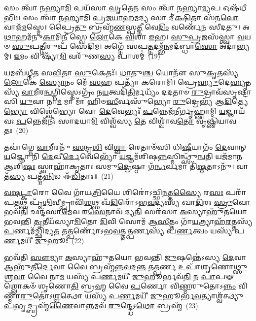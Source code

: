 {\anuvakamend[{\-\ul{𑌸}\-\-\ul{𑌮𑌾}\-𑌨𑌾\-\ul{𑌨𑌾}\-𑌮𑍋𑌷᳴𑌧𑍀\-\ul{𑌷𑍍𑌵𑍇}\-𑌵 \ul{𑌪}\-𑌶𑍂𑌨𑍍𑌮\-\ul{𑌹𑍍𑌯𑌂} 𑌯𑌜᳴𑌮𑌾\-\ul{𑌨𑌾}\-𑌯𑍈𑌕᳴𑌞𑍍𑌚}]}%

𑌸𑌂 𑌤𑍍𑌵𑌾᳴ 𑌨𑌹𑍍𑌯𑌾\-\ul{𑌮𑌿} 𑌪𑌯᳴𑌸𑌾 \ul{𑌘𑍃}\-𑌤𑍇\-\ul{𑌨} 𑌸𑌂 𑌤𑍍𑌵𑌾᳴ 𑌨𑌹𑍍𑌯𑌾\-\ul{𑌮𑍍𑌯}\-𑌪 𑌓𑌷᳴𑌧𑍀𑌭𑌿𑌃। 𑌸𑌂 𑌤𑍍𑌵𑌾᳴ 𑌨𑌹𑍍𑌯𑌾𑌮𑌿 \ul{𑌪𑍍𑌰}\-𑌜\-\ul{𑌯𑌾}\-𑌹\-\ul{𑌮}\-𑌦𑍍𑌯 𑌸𑌾 𑌦𑍀॑\-\ul{𑌕𑍍𑌷𑌿}\-𑌤𑌾 𑌸᳴𑌨\-\ul{𑌵𑍋} 𑌵𑌾𑌜᳴\-\ul{𑌮}\-𑌸𑍍𑌮𑍇। 𑌪𑍍𑌰𑍈\-\ul{𑌤𑍁} 𑌬𑍍𑌰𑌹𑍍𑌮᳴\-\ul{𑌣}\-𑌸𑍍𑌪\-\ul{𑌤𑍍𑌨𑍀} 𑌵𑍇\-\ul{𑌦𑌿𑌂} 𑌵𑌰𑍍𑌣𑍇᳴𑌨 𑌸𑍀𑌦𑌤𑍁। 𑌅\-\ul{𑌥𑌾}\-𑌹𑌮᳴𑌨𑍁\-\ul{𑌕𑌾}\-𑌮𑌿\-\ul{𑌨𑍀} 𑌸𑍍𑌵𑍇 \ul{𑌲𑍋}\-𑌕𑍇 \ul{𑌵𑌿}\-𑌶𑌾 \ul{𑌇}\-𑌹। \ul{𑌸𑍁}\-\-\ul{𑌪𑍍𑌰}\-𑌜𑌸᳴𑌸𑍍𑌤𑍍𑌵𑌾 \ul{𑌵}\-𑌯𑍞 \ul{𑌸𑍁}\-𑌪\-\ul{𑌤𑍍𑌨𑍀}\-𑌰𑍁𑌪᳴ 𑌸𑍇𑌦𑌿𑌮। 𑌅𑌗𑍍𑌨𑍇᳴ 𑌸𑌪\-\ul{𑌤𑍍𑌨}\-𑌦𑌮𑍍𑌭᳴\-\ul{𑌨}\-𑌮𑌦᳴𑌬𑍍𑌧𑌾\-\ul{𑌸𑍋} 𑌅𑌦𑌾॑𑌭𑍍𑌯𑌮𑍍। \ul{𑌇}\-𑌮𑌂 𑌵𑌿 𑌷𑍍𑌯𑌾᳴\-\ul{𑌮𑌿} 𑌵𑌰𑍁᳴𑌣\-\ul{𑌸𑍍𑌯} 𑌪𑌾𑌶𑌮𑍍॑~(19)

𑌯𑌮𑌬᳴𑌧𑍍𑌨𑍀𑌤 𑌸\-\ul{𑌵𑌿}\-𑌤𑌾 \ul{𑌸𑍁}\-𑌕𑍇𑌤𑌃᳴। \ul{𑌧𑌾}\-𑌤𑍁\-\ul{𑌶𑍍𑌚} 𑌯𑍋𑌨𑍗᳴ 𑌸𑍁\-\ul{𑌕𑍃}\-𑌤𑌸𑍍𑌯᳴ \ul{𑌲𑍋}\-𑌕𑍇 \ul{𑌸𑍍𑌯𑍋}\-𑌨𑌂 𑌮𑍇᳴ \ul{𑌸}\-𑌹 𑌪𑌤𑍍𑌯𑌾᳴ 𑌕𑌰𑍋𑌮𑌿। 𑌪𑍍𑌰𑍇\-\ul{𑌹𑍍𑌯𑍁}\-𑌦𑍇\-\ul{𑌹𑍍𑌯𑍃}\-𑌤𑌸𑍍𑌯᳴ \ul{𑌵𑌾}\-𑌮𑍀𑌰\-\ul{𑌨𑍍𑌵}\-𑌗𑍍𑌨𑌿𑌸𑍍𑌤𑍇\-𑌽𑌗𑍍𑌰𑌂᳴ 𑌨\-\ul{𑌯}\-𑌤𑍍𑌵𑌦𑌿᳴\-\ul{𑌤𑌿}\-𑌰𑍍𑌮𑌧𑍍𑌯𑌂᳴ 𑌦𑌦𑌤𑌾𑍞 \ul{𑌰𑍁}\-𑌦𑍍𑌰𑌾𑌵᳴𑌸𑍃𑌷𑍍𑌟𑌾𑌸𑌿 \ul{𑌯𑍁}\-𑌵𑌾 𑌨𑌾\-\ul{𑌮} 𑌮𑌾 𑌮𑌾᳴ 𑌹𑌿𑍞\-\ul{𑌸𑍀}\-𑌰𑍍𑌵𑌸𑍁᳴𑌭𑍍𑌯𑍋 \ul{𑌰𑍁}\-𑌦𑍍𑌰𑍇𑌭𑍍𑌯᳴ 𑌆\-\ul{𑌦𑌿}\-𑌤𑍍𑌯𑍇\-\ul{𑌭𑍍𑌯𑍋} 𑌵𑌿𑌶𑍍𑌵𑍇॑𑌭𑍍𑌯𑍋 𑌵𑍋 \ul{𑌦𑍇}\-𑌵𑍇𑌭𑍍𑌯𑌃᳴ \ul{𑌪}\-𑌨𑍍𑌨𑍇𑌜᳴𑌨𑍀𑌰𑍍𑌗𑍃𑌹𑍍𑌣𑌾𑌮𑌿 \ul{𑌯}\-𑌜𑍍𑌞𑌾𑌯᳴ 𑌵𑌃 \ul{𑌪}\-𑌨𑍍𑌨𑍇𑌜᳴𑌨𑍀𑌃 𑌸𑌾𑌦𑌯𑌾\-\ul{𑌮𑌿} 𑌵𑌿𑌶𑍍𑌵᳴𑌸𑍍𑌯 \ul{𑌤𑍇} 𑌵𑌿𑌶𑍍𑌵𑌾᳴𑌵\-\ul{𑌤𑍋} 𑌵𑍃𑌷𑍍𑌣𑌿᳴𑌯𑌾𑌵𑌤𑌃~(20)

𑌤𑌵𑌾॑𑌗𑍍𑌨𑍇 \ul{𑌵𑌾}\-𑌮𑍀𑌰𑌨𑍁᳴ \ul{𑌸}\-𑌨𑍍𑌦𑍃\-\ul{𑌶𑌿} 𑌵𑌿\-\ul{𑌶𑍍𑌵𑌾} 𑌰𑍇𑌤𑌾𑍞᳴𑌸𑌿 𑌧𑌿\-\ul{𑌷𑍀}\-𑌯𑌾𑌗𑌂᳴ \ul{𑌦𑍇}\-𑌵𑌾𑌨𑍍 \ul{𑌯}\-𑌜𑍍𑌞𑍋 𑌨𑌿 \ul{𑌦𑍇}\-𑌵𑍀\-\ul{𑌰𑍍𑌦𑍇}\-𑌵𑍇𑌭𑍍𑌯𑍋᳴ \ul{𑌯}\-𑌜𑍍𑌞𑌮᳴𑌶𑌿𑌷\-\ul{𑌨𑍍𑌨}\-𑌸𑍍𑌮𑌿𑌨𑍍𑌥𑍍𑌸𑍁᳴\-\ul{𑌨𑍍𑌵}\-𑌤𑌿 𑌯𑌜᳴𑌮𑌾𑌨 \ul{𑌆}\-𑌶𑌿\-\ul{𑌷𑌃} 𑌸𑍍𑌵𑌾𑌹𑌾᳴𑌕𑍃𑌤𑌾𑌃 𑌸𑌮𑍁\-\ul{𑌦𑍍𑌰𑍇}\-𑌷𑍍𑌠𑌾 𑌗᳴\-\ul{𑌨𑍍𑌧}\-𑌰𑍍𑌵𑌮𑌾 𑌤𑌿᳴\-\ul{𑌷𑍍𑌠}\-𑌤𑌾\-𑌽𑌨𑍁᳴। 𑌵𑌾𑌤᳴\-\ul{𑌸𑍍𑌯} 𑌪𑌤𑍍𑌮᳴\-\ul{𑌨𑍍𑌨𑌿}\-𑌡 𑌈᳴\-\ul{𑌡𑌿}\-𑌤𑌾𑌃॥~(21)

{\anuvakamend[{𑌪𑌾\-\ul{𑌶𑌂} 𑌵𑍃𑌷𑍍𑌣𑌿᳴𑌯𑌾𑌵𑌤\-\ul{𑌸𑍍𑌤𑍍𑌰𑌿}\-\-\ul{𑍞}\-𑌶𑌚𑍍𑌚᳴}]}%

\-\ul{𑌵}\-\-\ul{𑌷}\-\-\ul{𑌟𑍍𑌕𑌾}\-𑌰𑍋 𑌵𑍈 𑌗𑌾᳴𑌯\-\ul{𑌤𑍍𑌰𑌿}\-𑌯𑍈 𑌶𑌿𑌰𑍋॑\-𑌽𑌚𑍍𑌛𑌿\-\ul{𑌨}\-𑌤𑍍𑌤\-\ul{𑌸𑍍𑌯𑍈} 𑌰\-\ul{𑌸𑌃} 𑌪𑌰𑌾᳴𑌪\-\ul{𑌤}\-𑌥𑍍𑌸 𑌪𑍃᳴\-\ul{𑌥𑌿}\-𑌵𑍀𑌮𑍍𑌪𑍍𑌰𑌾𑌵𑌿᳴\-\ul{𑌶}\-𑌥𑍍𑌸 𑌖᳴\-\ul{𑌦𑌿}\-𑌰𑍋᳴\-𑌽𑌭\-\ul{𑌵}\-𑌦𑍍𑌯𑌸𑍍𑌯᳴ 𑌖𑌾\-\ul{𑌦𑌿}\-𑌰𑌃 \ul{𑌸𑍍𑌰𑍁}\-𑌵𑍋 𑌭𑌵᳴\-\ul{𑌤𑌿} 𑌛𑌨𑍍𑌦᳴𑌸𑌾\-\ul{𑌮𑍇}\-𑌵 𑌰\-\ul{𑌸𑍇}\-𑌨𑌾𑌵᳴ 𑌦𑍍𑌯\-\ul{𑌤𑌿} 𑌸𑌰᳴𑌸𑌾 \ul{𑌅}\-𑌸𑍍𑌯𑌾𑌹𑍁᳴𑌤𑌯𑍋 𑌭𑌵𑌨𑍍𑌤𑌿 \ul{𑌤𑍃}\-𑌤𑍀𑌯᳴𑌸𑍍𑌯𑌾\-\ul{𑌮𑌿}\-𑌤𑍋 \ul{𑌦𑌿}\-𑌵𑌿 𑌸𑍋𑌮᳴ 𑌆\-\ul{𑌸𑍀}\-𑌤𑍍𑌤𑌂 𑌗𑌾᳴\-\ul{𑌯}\-𑌤𑍍𑌰𑍍𑌯𑌾𑌹᳴\-\ul{𑌰}\-𑌤𑍍𑌤𑌸𑍍𑌯᳴ \ul{𑌪}\-𑌰𑍍𑌣𑌮᳴𑌚𑍍𑌛𑌿𑌦𑍍𑌯\-\ul{𑌤} 𑌤\-\ul{𑌤𑍍𑌪}\-𑌰𑍍𑌣𑍋᳴\-𑌽𑌭\-\ul{𑌵}\-𑌤𑍍𑌤\-\ul{𑌤𑍍𑌪}\-𑌰𑍍𑌣𑌸𑍍𑌯᳴ 𑌪\-\ul{𑌰𑍍𑌣}\-𑌤𑍍𑌵𑌂 𑌯𑌸𑍍𑌯᳴ 𑌪\-\ul{𑌰𑍍𑌣}\-𑌮𑌯𑍀᳴ \ul{𑌜𑍁}\-𑌹𑍂𑌃~(22)

𑌭𑌵᳴𑌤𑌿 \ul{𑌸𑍗}\-𑌮𑍍𑌯𑌾 \ul{𑌅}\-𑌸𑍍𑌯𑌾𑌹𑍁᳴𑌤𑌯𑍋 𑌭𑌵𑌨𑍍𑌤𑌿 \ul{𑌜𑍁}\-𑌷𑌨𑍍𑌤𑍇॑\-𑌽𑌸𑍍𑌯 \ul{𑌦𑍇}\-𑌵𑌾 𑌆𑌹𑍁᳴𑌤𑍀\-\ul{𑌰𑍍𑌦𑍇}\-𑌵𑌾 𑌵𑍈 𑌬𑍍𑌰𑌹𑍍𑌮᳴𑌨𑍍𑌨𑌵𑌦\-\ul{𑌨𑍍𑌤} 𑌤\-\ul{𑌤𑍍𑌪}\-𑌰𑍍𑌣 𑌉𑌪𑌾᳴𑌶𑍃𑌣𑍋\-\ul{𑌥𑍍𑌸𑍁}\-𑌶𑍍𑌰\-\ul{𑌵𑌾} 𑌵𑍈 𑌨𑌾\-\ul{𑌮} 𑌯𑌸𑍍𑌯᳴ 𑌪\-\ul{𑌰𑍍𑌣}\-𑌮𑌯𑍀᳴ \ul{𑌜𑍁}\-𑌹𑍂𑌰𑍍𑌭𑌵᳴\-\ul{𑌤𑌿} 𑌨 \ul{𑌪𑌾}\-𑌪𑍟 𑌶𑍍𑌲𑍋𑌕𑍞᳴ 𑌶𑍃𑌣𑍋\-\ul{𑌤𑌿} 𑌬𑍍𑌰\-\ul{𑌹𑍍𑌮} 𑌵𑍈 \ul{𑌪}\-𑌰𑍍𑌣𑍋 𑌵𑌿\-\ul{𑌣𑍍𑌮}\-𑌰𑍁𑌤𑍋\-𑌽\-\ul{𑌨𑍍𑌨𑌂} 𑌵𑌿𑌣𑍍𑌮𑌾᳴\-\ul{𑌰𑍁}\-𑌤𑍋॑\-𑌽\-\ul{𑌶𑍍𑌵}\-𑌤𑍍𑌥𑍋 𑌯𑌸𑍍𑌯᳴ 𑌪\-\ul{𑌰𑍍𑌣}\-𑌮𑌯𑍀᳴ \ul{𑌜𑍁}\-𑌹𑍂𑌰𑍍𑌭\-\ul{𑌵}\-𑌤𑍍𑌯𑌾𑌶𑍍𑌵᳴𑌤𑍍𑌥𑍍𑌯𑍁\-\ul{𑌪}\-𑌭𑍃𑌦𑍍𑌬𑍍𑌰𑌹𑍍𑌮᳴\-\ul{𑌣𑍈}\-𑌵𑌾\-\ul{𑌨𑍍𑌨}\-𑌮𑌵᳴ \ul{𑌰𑍁}\-𑌨𑍍𑌦𑍍𑌧𑍇\-𑌽\-\ul{𑌥𑍋} 𑌬𑍍𑌰𑌹𑍍𑌮᳴~(23)

